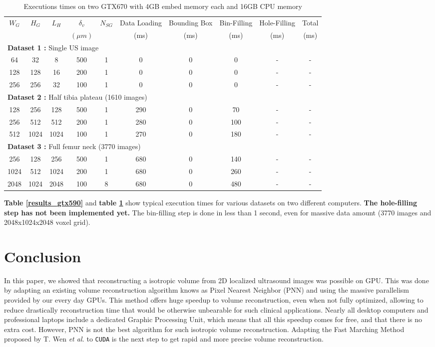 \documentclass[12pt,journal,compsoc]{IEEEtran}
\begin{document}
\begin{table}[!ht]
\renewcommand{\arraystretch}{1.3}
\caption{Executions times on two GTX670 with 4GB embed memory each and 16GB CPU memory}
\label{results_gtx670}
\centering
\begin{tabular}{|c|c|c||c|c||c|c|c|c||c|}
\hline
$W_G$ & $H_G$ & $L_H$ & $\delta_v$ & $N_{SG}$ & Data Loading & Bounding Box & Bin-Filling & Hole-Filling & Total \\
      &&&$(\mu m)$&&(ms)&(ms)&(ms)&(ms)&(ms)\\
\hline
\multicolumn{10}{|l|}{\textbf{Dataset 1 :} Single US image}\\
\hline
64&32&8&500&1&0&0&0&-&-\\
\hline
128&128&16&200&1&0&0&0&-&-\\
\hline
256&256&32&100&1&0&0&0&-&-\\
\hline
\hline
\multicolumn{10}{|l|}{\textbf{Dataset 2 :} Half tibia plateau (1610 images)}\\
\hline
128&256&128&500&1&290&0&70&-&-\\
\hline
256&512&512&200&1&280&0&100&-&-\\
\hline
512&1024&1024&100&1&270&0&180&-&-\\
\hline
\hline
\multicolumn{10}{|l|}{\textbf{Dataset 3 :} Full femur neck (3770 images)}\\
\hline
256&128&256&500&1&680&0&140&-&-\\
\hline
1024&512&1024&200&1&680&0&260&-&-\\
\hline
2048&1024&2048&100&8&680&0&480&-&-\\
\hline
\end{tabular}
\end{table}

\textbf{Table \ref{results_gtx590}} and \textbf{table \ref{results_gtx670}} show typical execution times for various datasets on two different computers.
\textbf{The hole-filling step has not been implemented yet.} The bin-filling step is done in less than 1 second, even for massive data amount (3770 images and 2048x1024x2048 voxel grid).

\newpage
\section{Conclusion}
In this paper, we showed that reconstructing a isotropic volume from 2D localized ultrasound images was possible on GPU.
This was done by adapting an existing volume reconstruction algorithm knows as Pixel Nearest Neighbor (PNN) and using the massive parallelism provided by our every day GPUs.
This method offers huge speedup to volume reconstruction, even when not fully optimized, allowing to reduce drastically reconstruction time that would be otherwise unbearable for such clinical applications.
Nearly all desktop computers and professional laptops include a dedicated Graphic Processing Unit, which means that all this speedup comes for free, and that there is no extra cost.
However, PNN is not the best algorithm for such isotropic volume reconstruction. Adapting the Fast Marching Method proposed by T. Wen \textit{et al.} \cite{2} to \texttt{CUDA} is the next step to get rapid and more precise volume reconstruction.
\end{document}
